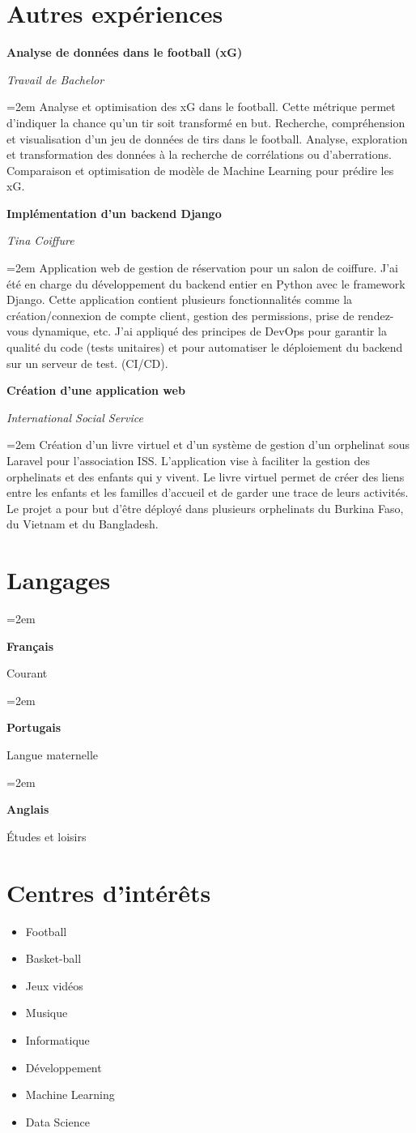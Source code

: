 \documentclass[12pt]{article} %
\newlength{\spacebox}
\newcommand{\sepspace}{\vspace*{1em}}
\newcommand{\otherxp}[4]{
    \noindent  \textbf{#1}
    \hfill
    \framebox{%
        \parbox{10em}{%
            \centering\textbf{#2}}} \par
    \noindent \textit{#3} \par
    \vspace*{0.5em}
    \noindent\hangindent=2em\hangafter=0 \small #4
    \normalsize \par}
\newcommand{\lan}[2]{
    \noindent\hangindent=2em\hangafter=0
    \parbox{\spacebox}{%
        \textbf{#1}} %
    #2 \par}    %
\begin{document}
\section*{Autres expériences}
\otherxp{Analyse de données dans le football (xG)}{2022-2023}{Travail de Bachelor}{Analyse et optimisation des xG dans le football. Cette métrique permet d'indiquer la chance qu'un tir soit transformé en but. Recherche, compréhension et visualisation d'un jeu de données de tirs dans le football. Analyse, exploration et transformation des données à la recherche de corrélations ou d'aberrations. Comparaison et optimisation de modèle de Machine Learning pour prédire les xG.}
\sepspace
\otherxp{Implémentation d'un backend Django}{2022-2023}{Tina Coiffure}{Application web de gestion de réservation pour un salon de coiffure. J'ai été en charge du développement du backend entier en Python avec le framework Django. Cette application contient plusieurs fonctionnalités comme la création/connexion de compte client, gestion des permissions, prise de rendez-vous dynamique, etc. J'ai appliqué des principes de DevOps pour garantir la qualité du code (tests unitaires) et pour automatiser le déploiement du backend sur un serveur de test. (CI/CD).}
\sepspace
\otherxp{Création d'une application web}{2018-2019}{International Social Service}{Création d'un livre virtuel et d'un système de gestion d'un orphelinat sous Laravel pour l'association ISS. L'application vise à faciliter la gestion des orphelinats et des enfants qui y vivent. Le livre virtuel permet de créer des liens entre les enfants et les familles d'accueil et de garder une trace de leurs activités. Le projet a pour but d'être déployé dans plusieurs orphelinats du Burkina Faso, du Vietnam et du Bangladesh.}


\section*{Langages}
\lan{Français}{Courant}
\lan{Portugais}{Langue maternelle}
\lan{Anglais}{Études et loisirs}

\section*{Centres d'intérêts}
\begin{itemize}
    \item Football
    \item Basket-ball
    \item Jeux vidéos
    \item Musique
    \item Informatique
    \item Développement
    \item Machine Learning
    \item Data Science
\end{itemize}
\end{document}
